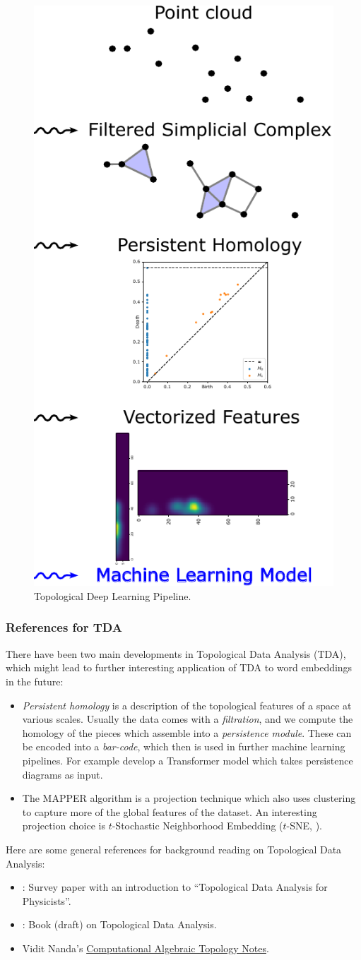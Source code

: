 \documentclass[11pt, a4paper]{amsart}
\begin{document}
\begin{figure}
	\centering
	\includegraphics[width=0.2\linewidth]{figures/topological_data_analysis/topological_deep_learning}
	\caption{
		Topological Deep Learning Pipeline.
		\label{fig:topological_deep_learning}
	}
\end{figure}       


\subsubsection{References for TDA}

There have been two main developments in Topological Data Analysis (TDA), which might lead to further interesting application of TDA to word embeddings in the future:
\begin{itemize}
	\item \emph{Persistent homology} is a description of the topological features of a space at various scales.
	Usually the data comes with a \emph{filtration}, and we compute the homology of the pieces which assemble into a \emph{persistence module}.
	These can be encoded into a \emph{bar-code}, which then is used in further machine learning pipelines.
	For example \cite{reinauer2021persformer} develop a Transformer model which takes persistence diagrams as input. 
	
	\item The MAPPER algorithm is a projection technique which also uses clustering to capture more of the global features of the dataset.
	An interesting projection choice is $t$-Stochastic Neighborhood Embedding ($t$-SNE, \cite{JMLR:v9:vandermaaten08a}).
\end{itemize}

Here are some general references for background reading on Topological Data Analysis:
\begin{itemize}
	\item \cite{murugan2019introduction}: Survey paper with an introduction to ``Topological Data Analysis for Physicists''.
	\item \cite{dey2021computational}: Book (draft) on Topological Data Analysis.
	\item Vidit Nanda's \href{http://people.maths.ox.ac.uk/nanda/cat/TDANotes.pdf}{Computational Algebraic Topology Notes}.
\end{itemize}
\end{document}
